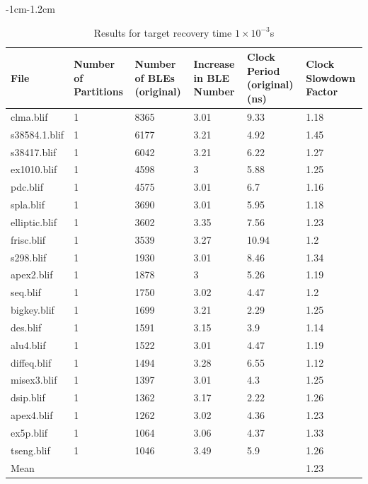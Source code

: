 \documentclass[12pt,final,oneside]{dwThesis} %
\begin{document}
   \begin{table}
      \footnotesize 
      \begin{adjustwidth}
         {-1cm}{-1.2cm}

         \begin{tabularx}
            {1.1\textwidth}{XXXXXX} \toprule File & Number of
            Partitions &  Number of BLEs (original) &  Increase in BLE
            Number &  Clock Period (original) (ns) &  Clock Slowdown
            Factor\\
            \midrule clma.blif & 1 & 8365 & 3.01 & 9.33 & 1.18\\

            s38584.1.blif & 1 & 6177 & 3.21 & 4.92 & 1.45\\
            s38417.blif & 1
            & 6042 & 3.21 & 6.22 & 1.27\\
            ex1010.blif & 1 & 4598 & 3 & 5.88
            & 1.25\\
            pdc.blif & 1 & 4575 & 3.01 & 6.7 & 1.16\\
            spla.blif & 1
            & 3690 & 3.01 & 5.95 & 1.18\\
            elliptic.blif & 1 & 3602 & 3.35 &
            7.56 & 1.23\\
            frisc.blif & 1 & 3539 & 3.27 & 10.94 & 1.2\\

            s298.blif & 1 & 1930 & 3.01 & 8.46 & 1.34\\
            apex2.blif & 1 &
            1878 & 3 & 5.26 & 1.19\\
            seq.blif & 1 & 1750 & 3.02 & 4.47 &
            1.2\\
            bigkey.blif & 1 & 1699 & 3.21 & 2.29 & 1.25\\
            des.blif & 1
            & 1591 & 3.15 & 3.9 & 1.14\\
            alu4.blif & 1 & 1522 & 3.01 & 4.47
            & 1.19\\
            diffeq.blif & 1 & 1494 & 3.28 & 6.55 & 1.12\\

            misex3.blif & 1 & 1397 & 3.01 & 4.3 & 1.25\\
            dsip.blif & 1 &
            1362 & 3.17 & 2.22 & 1.26\\
            apex4.blif & 1 & 1262 & 3.02 & 4.36
            & 1.23\\
            ex5p.blif & 1 & 1064 & 3.06 & 4.37 & 1.33\\
            tseng.blif
            & 1 & 1046 & 3.49 & 5.9 & 1.26\\
            Mean &         &           &
            &          & 1.23\\
            \bottomrule 
         \end{tabularx}
         \caption{Results
            for target recovery time $1\times10^{-3}$s} \label{Results1e-3}

      \end{adjustwidth}

   \end{table}
\end{document}
